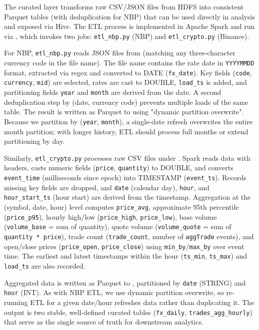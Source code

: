 \documentclass{article}
\begin{document}
The curated layer transforms raw CSV/JSON files from HDFS into consistent
Parquet tables (with deduplication for NBP) that can be used directly in
analysis and exposed via Hive. The ETL process is implemented in Apache
Spark and run via , which invokes two jobs:
\texttt{etl\_nbp.py} (NBP) and \texttt{etl\_crypto.py} (Binance).

For NBP, \texttt{etl\_nbp.py} reads JSON files from
(matching any three-character currency code in the file name). The file
name contains the rate date in \texttt{YYYYMMDD} format, extracted via
regex and converted to DATE (\texttt{fx\_date}).
Key fields (\texttt{code}, \texttt{currency}, \texttt{mid}) are selected,
rates are cast to DOUBLE, \texttt{load\_ts} is added, and partitioning
fields \texttt{year} and \texttt{month} are derived from the date. A
second deduplication step by (date, currency code) prevents multiple
loads of the same table. The result is written as Parquet to
 using "dynamic partition
overwrite". Because we partition by (\texttt{year}, \texttt{month}), a
single-date refresh overwrites the entire month partition; with longer
history, ETL should process full months or extend partitioning by day.

Similarly, \texttt{etl\_crypto.py} processes raw CSV files under
.
Spark reads data with headers, casts numeric fields (\texttt{price},
\texttt{quantity}) to DOUBLE, and converts \texttt{event\_time}
(milliseconds since epoch) into TIMESTAMP (\texttt{event\_ts}). Records
missing key fields are dropped, and \texttt{date} (calendar day),
\texttt{hour}, and \texttt{hour\_start\_ts} (hour start) are derived from
the timestamp. Aggregation at the (symbol, date, hour) level computes
\texttt{price\_avg}, approximate 95th percentile (\texttt{price\_p95}),
hourly high/low (\texttt{price\_high}, \texttt{price\_low}), base volume
(\texttt{volume\_base} = sum of quantity), quote volume
(\texttt{volume\_quote} = sum of \texttt{quantity * price}), trade count
(\texttt{trade\_count}, number of \texttt{aggTrade} events), and
open/close prices (\texttt{price\_open}, \texttt{price\_close}) using
\texttt{min\_by}/\texttt{max\_by} over event time. The earliest and latest
timestamps within the hour (\texttt{ts\_min}, \texttt{ts\_max}) and
\texttt{load\_ts} are also recorded.

Aggregated data is written as Parquet to
, partitioned by
\texttt{date} (STRING) and \texttt{hour} (INT). As with NBP ETL, we use
dynamic partition overwrite, so re-running ETL for a given date/hour
refreshes data rather than duplicating it. The output is two stable,
well-defined curated tables (\texttt{fx\_daily},
\texttt{trades\_agg\_hourly}) that serve as the single source of truth
for downstream analytics.
\end{document}
